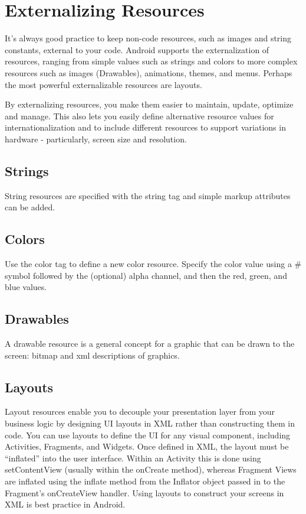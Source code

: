 \section{Externalizing Resources}
It’s always good practice to keep non-code resources, such as images and string constants, external to your code.
Android supports the externalization of resources, ranging from simple values such as strings and colors to more complex resources such as images (Drawables), animations, themes, and menus.
Perhaps the most powerful externalizable resources are layouts.

By externalizing resources, you make them easier to maintain, update, optimize and manage.
This also lets you easily define alternative resource values for internationalization and to include different resources to support variations in hardware - particularly, screen size and resolution.

\subsection{Strings}
String resources are specified with the string tag and simple markup attributes can be added.
\subsection{Colors}
Use the color tag to define a new color resource.
Specify the color value using a \# symbol followed by the (optional) alpha channel, and then the red, green, and blue values.
\subsection{Drawables}
A drawable resource is a general concept for a graphic that can be drawn to the screen: bitmap and xml descriptions of graphics.
\subsection{Layouts}
Layout resources enable you to decouple your presentation layer from your business logic by designing UI layouts in XML rather than constructing them in code.
You can use layouts to define the UI for any visual component, including Activities, Fragments, and Widgets.
Once defined in XML, the layout must be “inflated” into the user interface.
Within an Activity this is done using setContentView (usually within the onCreate method), whereas Fragment Views are inflated using the inflate method from the Inflator object passed in to the Fragment’s onCreateView handler.
Using layouts to construct your screens in XML is best practice in Android.

